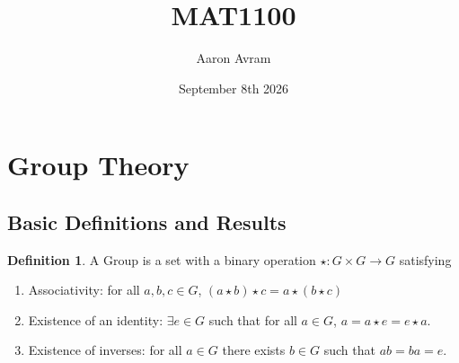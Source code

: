 \documentclass[12pt]{article}
\title{MAT1100}
\author{Aaron Avram}
\date{September 8th 2026}
\begin{document}
\theoremstyle{plain}
\newtheorem{theorem}{Theorem}
\newtheorem{proposition}{Proposition}
\newtheorem{lemma}[theorem]{Lemma}
\newtheorem{corollary}[theorem]{Corollary}
\newtheorem{claim}[theorem]{Claim}

\theoremstyle{definition}
\newtheorem{definition}{Definition}
\newtheorem{example}{Example}
\newtheorem{exercise}[theorem]{Exercise}

\theoremstyle{remark}
\newtheorem{remark}[theorem]{Remark}
\newtheorem{note}[theorem]{Note}

\maketitle

\tableofcontents
\newpage

\section{Group Theory}

\subsection{Basic Definitions and Results}
\begin{definition}
    A Group is a set with a binary operation $\star: G \times G \to G$ satisfying
    \begin{enumerate}
        \item Associativity: for all $a, b, c \in G$, $(a \star b) \star c = a \star (b \star c)$
        \item Existence of an identity: $\exists e \in G$ such that for all $a \in G$, $a = a \star e = e \star a$.
        \item Existence of inverses: for all $a \in G$ there exists $b \in G$ such that $ab = ba = e$.
    \end{enumerate}
\end{definition}
\end{document}
